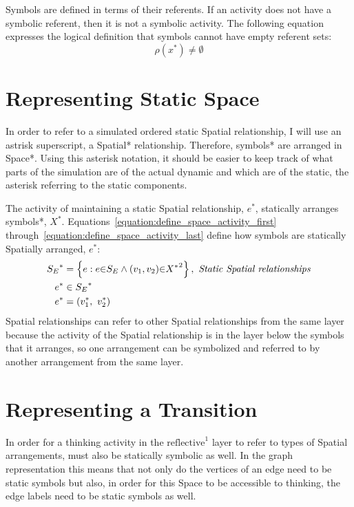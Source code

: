 Symbols are defined in terms of their referents.  If an activity does
not have a symbolic referent, then it is not a symbolic activity.  The
following equation expresses the logical definition that symbols
cannot have empty referent sets:
\begin{equation*}
\rho(x^*) \neq \emptyset
\end{equation*}

\section{Representing Static Space}

In order to refer to a simulated ordered static Spatial relationship,
I will use an astrisk superscript, a Spatial* relationship.
Therefore, symbols* are arranged in Space*.  Using this asterisk
notation, it should be easier to keep track of what parts of the
simulation are of the actual dynamic and which are of the static, the
asterisk referring to the static components.

The activity of maintaining a static Spatial relationship, $e^*$,
statically arranges symbols*, $X^*$.
Equations~\ref{equation:define_space_activity_first}
through~\ref{equation:define_space_activity_last} define how symbols
are statically Spatially arranged, $e^*$:
\begin{align}
\label{equation:define_space_activity_first}
        {S_E}^* &= \left\{e : e{\in}S_E \wedge (v_1, v_2) {\in} {X^*}^2\right\}, ~\text{\emph{Static Spatial relationships}} \\
      e^* &\in {S_E}^* \\
\label{equation:define_space_activity_last}
      e^* &= (v_1^*, ~v_2^*)
\end{align}
Spatial relationships can refer to other Spatial relationships from
the same layer because the activity of the Spatial relationship is in
the layer below the symbols that it arranges, so one arrangement can
be symbolized and referred to by another arrangement from the same
layer.

\section{Representing a Transition}

In order for a thinking activity in the $\text{reflective}^1$ layer to
refer to types of Spatial arrangements, must also be statically
symbolic as well.  In the graph representation this means that not
only do the vertices of an edge need to be static symbols but also, in
order for this Space to be accessible to thinking, the edge labels
need to be static symbols as well.

